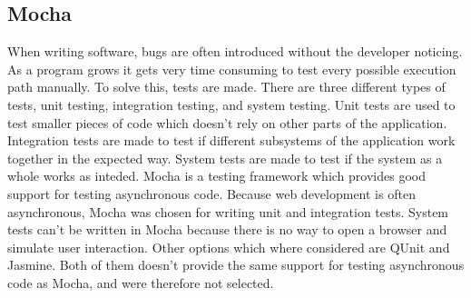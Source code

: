 \subsection{Mocha}
When writing software, bugs are often introduced without the developer noticing. As a program grows it gets very time consuming to test every possible execution path manually. To solve this, tests are made. There are three different types of tests, unit testing, integration testing, and system testing. Unit tests are used to test smaller pieces of code which doesn't rely on other parts of the application. Integration tests are made to test if different subsystems of the application work together in the expected way. System tests are made to test if the system as a whole works as inteded. Mocha is a testing framework which provides good support for testing asynchronous code. Because web development is often asynchronous, Mocha was chosen for writing unit and integration tests. System tests can't be written in Mocha because there is no way to open a browser and simulate user interaction. Other options which where considered are QUnit and Jasmine. Both of them doesn't provide the same support for testing asynchronous code as Mocha, and were therefore not selected.